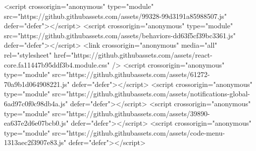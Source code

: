 <script crossorigin="anonymous" type="module" src="https://github.githubassets.com/assets/99328-99d3191a85988507.js" defer="defer"></script>
<script crossorigin="anonymous" type="module" src="https://github.githubassets.com/assets/behaviors-dd63f5cf39bc3361.js" defer="defer"></script>
<link crossorigin="anonymous" media="all" rel="stylesheet" href="https://github.githubassets.com/assets/react-core.fa11447b95ddf3b4.module.css" />
<script crossorigin="anonymous" type="module" src="https://github.githubassets.com/assets/61272-70a9b1d064908221.js" defer="defer"></script>
<script crossorigin="anonymous" type="module" src="https://github.githubassets.com/assets/notifications-global-6ad97c0f0c98db4a.js" defer="defer"></script>
<script crossorigin="anonymous" type="module" src="https://github.githubassets.com/assets/39890-ea637e2d6e07bcb0.js" defer="defer"></script>
<script crossorigin="anonymous" type="module" src="https://github.githubassets.com/assets/code-menu-1313aec2f3907e83.js" defer="defer"></script>
  
